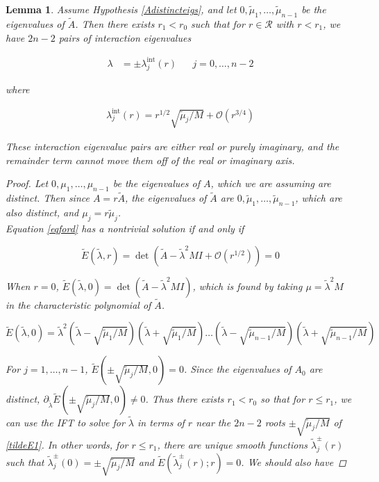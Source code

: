 \documentclass[12pt]{article}
\newtheorem{lemma}{Lemma}
\begin{document}

\begin{lemma}\label{inteigslemma}
Assume Hypothesis \ref{Adistincteigs}, and let $0, \tilde{\mu}_1, \dots, \tilde{\mu}_{n-1}$ be the eigenvalues of $\tilde{A}$. Then there exists $r_1 < r_0$ such that for $r \in \mathcal{R}$ with $r < r_1$, we have $2n - 2$ pairs of interaction eigenvalues

\begin{align*}
\lambda &= \pm \lambda^{\text{int}}_j(r) && j = 0, \dots, n-2
\end{align*}

where

\begin{align*}
\lambda^{\text{int}}_j(r) = r^{1/2} \sqrt{\tilde{\mu}_j / M} + \mathcal{O}(r^{3/4})
\end{align*}

These interaction eigenvalue pairs are either real or purely imaginary, and the remainder term cannot move them off of the real or imaginary axis.

\begin{proof}
Let $0, \mu_1, \dots, \mu_{n-1}$ be the eigenvalues of $A$, which we are assuming are distinct. Then since $A = r \tilde{A}$, the eigenvalues of $\tilde{A}$ are $0, \tilde{\mu}_1, \dots, \tilde{\mu}_{n-1}$, which are also distinct, and $\mu_j = r \tilde{\mu}_j$.\\

Equation \eqref{eqford} has a nontrivial solution if and only if

\[
\tilde{E}(\tilde{\lambda}, r) = \det
\left( \tilde{A} - \tilde{\lambda}^2 MI + \mathcal{O}(r^{1/2}) \right) = 0
\]

When $r = 0$, $\tilde{E}(\tilde{\lambda}, 0) = \det(\tilde{A} - \tilde{\lambda}^2 MI)$, which is found by taking $\mu = \tilde{\lambda}^2 M$ in the characteristic polynomial of $\tilde{A}$.

\begin{equation}\label{tildeE1}
\tilde{E}(\tilde{\lambda}, 0) = \tilde{\lambda}^2
\left( \tilde{\lambda} - \sqrt{\tilde{\mu}_1 / M} \right)
\left( \tilde{\lambda} + \sqrt{\tilde{\mu}_1 / M} \right) \dots
\left( \tilde{\lambda} - \sqrt{\tilde{\mu}_{n-1} / M} \right)
\left( \tilde{\lambda} + \sqrt{\tilde{\mu}_{n-1} / M} \right)
\end{equation}

For $j = 1, \dots, n-1$, $\tilde{E}(\pm \sqrt{\tilde{\mu}_j / M}, 0) = 0$. Since the eigenvalues of $A_0$ are distinct, $\partial_{\tilde{\lambda}} \tilde{E}(\pm \sqrt{\tilde{\mu}_j / M}, 0) \neq 0$. Thus there exists $r_1 < r_0$ so that for $r \leq r_1$, we can use the IFT to solve for $\tilde{\lambda}$ in terms of $r$ near the $2n-2$ roots $\pm \sqrt{\tilde{\mu}_j / M}$ of \eqref{tildeE1}. In other words, for $r \leq r_1$, there are unique smooth functions $\tilde{\lambda}_j^\pm(r)$ such that $\tilde{\lambda}_j^\pm(0) = \pm \sqrt{\tilde{\mu}_j / M}$ and $\tilde{E}(\tilde{\lambda}_j^\pm(r); r) = 0$. We should also have


\end{proof}
\end{lemma}
\end{document}
